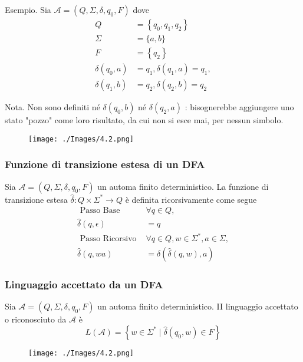 Esempio. Sia $\mathcal{A}=\left(Q, \Sigma, \delta, q_{0}, F\right)$ dove
$$
\begin{aligned}
Q &=\left\{q_{0}, q_{1}, q_{2}\right\} \\
\Sigma &=\{a, b\} \\
F &=\left\{q_{2}\right\} \\
\delta\left(q_{0}, a\right) &=q_{1}, \delta\left(q_{1}, a\right)=q_{1}, \\
\delta\left(q_{1}, b\right) &=q_{2}, \delta\left(q_{2}, b\right)=q_{2}
\end{aligned}
$$

Nota. Non sono definiti né $\delta\left(q_{0}, b\right)$ né $\delta\left(q_{2}, a\right)$ : bisognerebbe aggiungere uno stato "pozzo" come loro risultato, da cui non si esce mai, per nessun simbolo.

\begin{figure}[hbpt!]
    \centering
    \texttt{[image: ./Images/4.2.png]}
\end{figure}
\FloatBarrier

\subsubsection{Funzione di transizione estesa di un DFA}

Sia $\mathcal{A}=\left(Q, \Sigma, \delta, q_{0}, F\right)$ un automa finito deterministico. La funzione di transizione estesa $\hat{\delta}: Q \times \Sigma^{*} \rightarrow Q$ è definita ricorsivamente come segue
$$
\begin{aligned}
\text { Passo Base } & \forall q \in Q, \\
\hat{\delta}(q, \epsilon) &=q \\
\text { Passo Ricorsivo } & \forall q \in Q, w \in \Sigma^{*}, a \in \Sigma, \\
\hat{\delta}(q, w a) &=\delta(\hat{\delta}(q, w), a)
\end{aligned}
$$

\subsubsection{Linguaggio accettato da un DFA}

Sia $\mathcal{A}=\left(Q, \Sigma, \delta, q_{0}, F\right)$ un automa finito deterministico. II linguaggio accettato o riconosciuto da $\mathcal{A}$ è
$$
L(\mathcal{A})=\left\{w \in \Sigma^{*} \mid \hat{\delta}\left(q_{0}, w\right) \in F\right\}
$$

\begin{figure}[hbpt!]
    \centering
    \texttt{[image: ./Images/4.2.png]}
\end{figure}
\FloatBarrier

